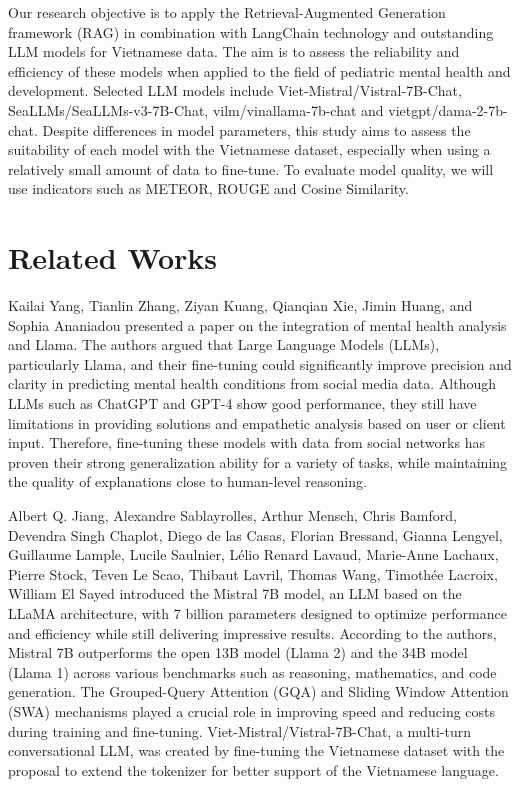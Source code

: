 \documentclass[conference]{IEEEtran}
\begin{document}
Our research objective is to apply the Retrieval-Augmented Generation framework (RAG) in combination with LangChain technology and outstanding LLM models for Vietnamese data. The aim is to assess the reliability and efficiency of these models when applied to the field of pediatric mental health and development. Selected LLM models include Viet-Mistral/Vistral-7B-Chat, SeaLLMs/SeaLLMs-v3-7B-Chat, vilm/vinallama-7b-chat and vietgpt/dama-2-7b-chat. Despite differences in model parameters, this study aims to assess the suitability of each model with the Vietnamese dataset, especially when using a relatively small amount of data to fine-tune. To evaluate model quality, we will use indicators such as METEOR, ROUGE and Cosine Similarity.

\section{Related Works}
\label{sec:Related Works}
Kailai Yang, Tianlin Zhang, Ziyan Kuang, Qianqian Xie, Jimin Huang, and Sophia Ananiadou \cite{b1} presented a paper on the integration of mental health analysis and Llama. The authors argued that Large Language Models (LLMs), particularly Llama, and their fine-tuning could significantly improve precision and clarity in predicting mental health conditions from social media data. Although LLMs such as ChatGPT and GPT-4 show good performance, they still have limitations in providing solutions and empathetic analysis based on user or client input. Therefore, fine-tuning these models with data from social networks has proven their strong generalization ability for a variety of tasks, while maintaining the quality of explanations close to human-level reasoning.

Albert Q. Jiang, Alexandre Sablayrolles, Arthur Mensch, Chris Bamford, Devendra Singh Chaplot, Diego de las Casas, Florian Bressand, Gianna Lengyel, Guillaume Lample, Lucile Saulnier, Lélio Renard Lavaud, Marie-Anne Lachaux, Pierre Stock, Teven Le Scao, Thibaut Lavril, Thomas Wang, Timothée Lacroix, William El Sayed \cite{b2} introduced the Mistral 7B model, an LLM based on the LLaMA architecture, with 7 billion parameters designed to optimize performance and efficiency while still delivering impressive results. According to the authors, Mistral 7B outperforms the open 13B model (Llama 2) and the 34B model (Llama 1) across various benchmarks such as reasoning, mathematics, and code generation. The Grouped-Query Attention (GQA) and Sliding Window Attention (SWA) mechanisms played a crucial role in improving speed and reducing costs during training and fine-tuning. Viet-Mistral/Vistral-7B-Chat, a multi-turn conversational LLM, was created by fine-tuning the Vietnamese dataset with the proposal to extend the tokenizer for better support of the Vietnamese language.
\end{document}

